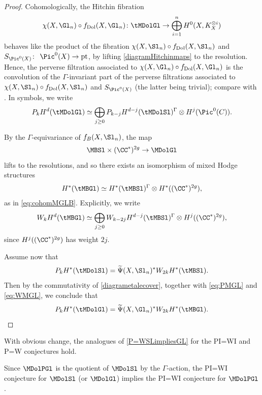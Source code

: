 \begin{proof}
Cohomologically, the Hitchin fibration
\[
\chi(X,\Gl_n) \circ f_{\mathrm{Dol}}(X, \Gl_n)\colon \tMDolGl \to \bigoplus_{i=1}^nH^0(X,K_X^{\otimes i})
\]
behaves like the product of the fibration
$\chi(X,\Sl_n) \circ f_{\mathrm{Dol}}(X, \Sl_n)$ and $S_{\Pic^0(X)}\colon$ $\Pic^0(X) \to \mathrm{pt}$, by lifting \eqref{diagramHitchinmaps} to the resolution. Hence, the perverse filtration associated to
$\chi(X, \Gl_n) \circ f_{\mathrm{Dol}}(X, \Gl_n)$ is the convolution of the $\Gamma$-invariant part of the perverse filtrations associated to $\chi(X, \Sl_n) \circ f_{\mathrm{Dol}}(X, \Sl_n)$ and $S_{\Pic^0(X)}$ (the latter being trivial); compare with \cite[\S 2.4]{deCataldoHauselMigliorini2012}. In symbols, we write
\begin{equation}\label{eq:PMGL}
P_kH^d( \tMDolGl) \simeq \bigoplus_{j\geq 0} P_{k-j}H^{d-j}(\tMDolSl)^{\Gamma}\otimes H^j(\Pic^0(C)).
\end{equation}

By the $\Gamma$-equivariance of $f_{B}(X, \Sl_n)$, the map
\[
\MBSl \times (\CC^{*})^{2g} \to \MDolGl
\]
lifts to the resolutions, and so there exists an isomorphism of mixed Hodge structures
\begin{align}
H^*(\tMBGl) \simeq H^*(\tMBSl)^{\Gamma} \otimes H^*( (\CC^{*})^{2g}), \label{eq:cohomtMGLB}
\end{align}
as in \eqref{eq:cohomMGLB}. Explicitly, we write
\begin{equation}\label{eq:WMGL}
W_{k}H^d(\tMBGl) \simeq \bigoplus_{j\geq 0} W_{k-2j}H^{d-j}(\tMBSl)^{\Gamma}\otimes H^j((\CC^*)^{2g}),
\end{equation}
since $H^j((\CC^*)^{2g})$ has weight $2j$.

Assume now that
\[
P_{k}H^*(\tMDolSl) = \widetilde{\Psi}(X, \Sl_n)^* W_{2k}H^*(\tMBSl).
\]
Then by the commutativity of \eqref{diagrametalecover}, together with \eqref{eq:PMGL} and \eqref{eq:WMGL}, we conclude that
\[
P_{k}H^*(\tMDolGl) = \widetilde{\Psi}(X, \Gl_n)^* W_{2k}H^*(\tMBGl).\qedhere
\]
\end{proof}

\begin{rmk}
With obvious change, the analogues of \cref{P=WSLimpliesGL} for the PI=WI and P=W conjectures hold.
\end{rmk}

\begin{rmk}\label{rmk:PGLn}
Since $\MDolPGl$ is the quotient of $\MDolSl$ by the $\Gamma$-action, the PI=WI conjecture for $\MDolSl$ (or $\MDolGl$) implies the PI=WI conjecture for $\MDolPGl$.
\end{rmk}

